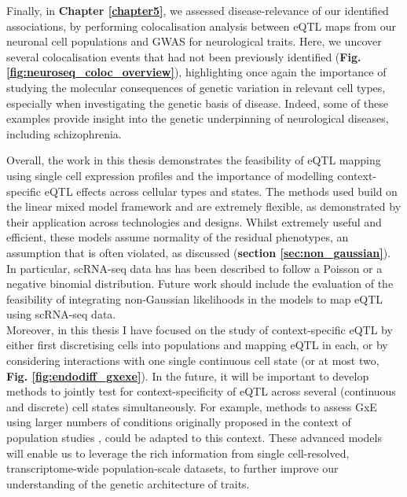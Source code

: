 Finally, in \textbf{Chapter \ref{chapter5}}, we assessed disease-relevance of our identified associations, by performing colocalisation analysis between eQTL maps from our neuronal cell populations and GWAS for neurological traits.
Here, we uncover several colocalisation events that had not been previously identified (\textbf{Fig. \ref{fig:neuroseq_coloc_overview}}), highlighting once again the importance of studying the molecular consequences of genetic variation in relevant cell types, especially when investigating the genetic basis of disease.
Indeed, some of these examples provide insight into the genetic underpinning of neurological diseases, including schizophrenia.

Overall, the work in this thesis demonstrates the feasibility of eQTL mapping using single cell expression profiles and the importance of modelling context-specific eQTL effects across cellular types and states.
The methods used build on the linear mixed model framework and are extremely flexible, as demonstrated by their application across technologies and designs. 
Whilst extremely useful and efficient, these models assume normality of the residual phenotypes, an assumption that is often violated, as discussed (\textbf{section \ref{sec:non_gaussian}}).
In particular, scRNA-seq data has has been described to follow a Poisson or a negative binomial \cite{grun2014validation, hafemeister2019normalization, svensson2020droplet} distribution.
Future work should include the evaluation of the feasibility of integrating non-Gaussian likelihoods in the models to map eQTL using scRNA-seq data. \\

Moreover, in this thesis I have focused on the study of context-specific eQTL by either first discretising cells into populations and mapping eQTL in each, or by considering interactions with one single continuous cell state (or at most two, \textbf{Fig. 
\ref{fig:endodiff_gxexe}}).
In the future, it will be important to develop methods to jointly test for context-specificity of eQTL across several (continuous and discrete) cell states simultaneously.
For example, methods to assess GxE using larger numbers of conditions originally proposed in the context of population studies \cite{moore2019linear}, could be adapted to this context. These advanced models will enable us to leverage the rich information from single cell-resolved, transcriptome-wide population-scale datasets, to further improve our understanding of the genetic architecture of traits. 

